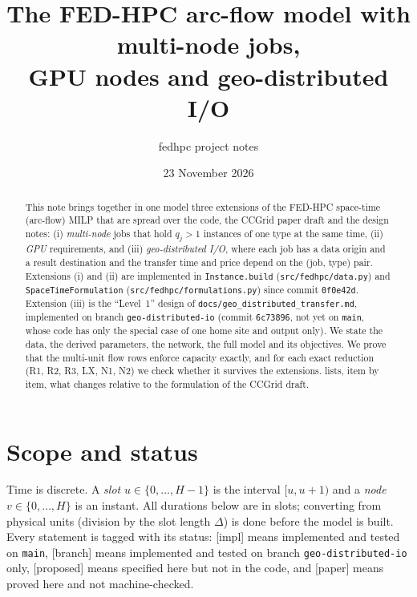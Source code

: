 \documentclass[11pt,a4paper]{article}
\title{The FED-HPC arc-flow model with multi-node jobs,\\
GPU nodes and geo-distributed I/O}
\author{fedhpc project notes}
\date{23 November 2026}
\newcommand{\code}[1]{\texttt{#1}}
\newcommand{\status}[1]{\textsf{\small[#1]}}
\begin{document}
\maketitle

\begin{abstract}
This note brings together in one model three extensions of the FED-HPC
space-time (arc-flow) MILP that are spread over the code, the CCGrid
paper draft and the design notes: (i) \emph{multi-node} jobs that hold $q_j>1$
instances of one type at the same time, (ii) \emph{GPU} requirements, and
(iii) \emph{geo-distributed I/O}, where each job has a data origin and a result
destination and the transfer time and price depend on the (job, type) pair.
Extensions (i) and (ii) are implemented in \code{Instance.build}
(\code{src/fedhpc/data.py}) and \code{SpaceTimeFormulation}
(\code{src/fedhpc/formulations.py}) since commit \code{0f0e42d}. Extension
(iii) is the ``Level~1'' design of \code{docs/geo\_distributed\_transfer.md},
implemented on branch \code{geo-distributed-io} (commit \code{6c73896}, not yet
on \code{main}, whose code has only the special case of one home site and
output only). We state the data, the derived parameters,
the network, the full model and its objectives. We prove that the multi-unit
flow rows enforce capacity exactly, and for each exact reduction (R1, R2, R3,
LX, N1, N2) we check whether it survives the extensions.
 lists, item by item, what changes relative to the
formulation of the CCGrid draft.
\end{abstract}

\tableofcontents

\section{Scope and status}\label{sec:scope}

Time is discrete. A \emph{slot} $u\in\{0,\dots,H-1\}$ is the interval $[u,u+1)$
and a \emph{node} $v\in\{0,\dots,H\}$ is an instant. All durations below are in
slots; converting from physical units (division by the slot length $\Delta$) is
done before the model is built. Every statement is tagged with its status:
\status{impl} means implemented and tested on \code{main}, \status{branch}
means implemented and tested on branch \code{geo-distributed-io} only,
\status{proposed} means specified here but not in the code, and
\status{paper} means proved here and not machine-checked.
\end{document}

